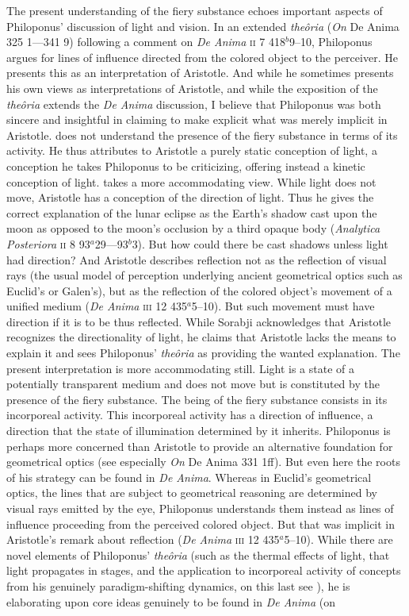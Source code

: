 The present understanding of the fiery substance echoes important aspects of Philoponus' discussion of light and vision. In an extended \emph{theôria} (\emph{On} De Anima 325 1---341 9) following a comment on \emph{De Anima} \textsc{ii} 7 418\( ^{b} \)9--10, Philoponus argues for lines of influence directed from the colored object to the perceiver. He presents this as an interpretation of Aristotle. And while he sometimes presents his own views as interpretations of Aristotle, and while the exposition of the \emph{theôria} extends the \emph{De Anima} discussion, I believe that Philoponus was both sincere and insightful in claiming to make explicit what was merely implicit in Aristotle. \citet{Sambursky:1958aa} does not understand the presence of the fiery substance in terms of its activity. He thus attributes to Aristotle a purely static conception of light, a conception he takes Philoponus to be criticizing, offering instead a kinetic conception of light. \citet[26--30]{Sorabji:1987vn} takes a more accommodating view. While light does not move, Aristotle has a conception of the direction of light. Thus he gives the correct explanation of the lunar eclipse as the Earth's shadow cast upon the moon as opposed to the moon's occlusion by a third opaque body (\emph{Analytica Posteriora} \textsc{ii} 8 93\( ^{a} \)29---93\( ^{b} \)3). But how could there be cast shadows unless light had direction? And Aristotle describes reflection not as the reflection of visual rays (the usual model of perception underlying ancient geometrical optics such as Euclid's or Galen's), but as the reflection of the colored object's movement of a unified medium (\emph{De Anima} \textsc{iii} 12 435\( ^{a} \)5--10). But such movement must have direction if it is to be thus reflected. While Sorabji acknowledges that Aristotle recognizes the directionality of light, he claims that Aristotle lacks the means to explain it and sees Philoponus' \emph{theôria} as providing the wanted explanation. The present interpretation is more accommodating still. Light is a state of a potentially transparent medium and does not move but is constituted by the presence of the fiery substance. The being of the fiery substance consists in its incorporeal activity. This incorporeal activity has a direction of influence, a direction that the state of illumination determined by it inherits. Philoponus is perhaps more concerned than Aristotle to provide an alternative foundation for geometrical optics (see especially \emph{On} De Anima 331 1ff). But even here the roots of his strategy can be found in \emph{De Anima}. Whereas in Euclid's geometrical optics, the lines that are subject to geometrical reasoning are determined by visual rays emitted by the eye, Philoponus understands them instead as lines of influence proceeding from the perceived colored object. But that was implicit in Aristotle's remark about reflection (\emph{De Anima} \textsc{iii} 12 435\( ^{a} \)5--10). While there are novel elements of Philoponus' \emph{theôria} (such as the thermal effects of light, that light propagates in stages, and the application to incorporeal activity of concepts from his genuinely paradigm-shifting dynamics, on this last see \citealt{Kuhn:1962ss,Wolff:1987vn}), he is elaborating upon core ideas genuinely to be found in \emph{De Anima} (on 